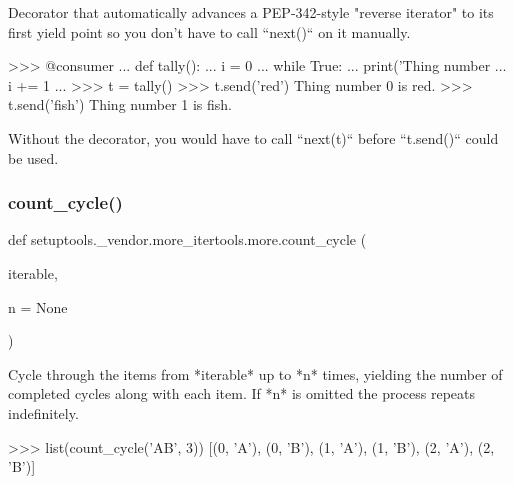 \begin{DoxyVerb}Decorator that automatically advances a PEP-342-style "reverse iterator"
to its first yield point so you don't have to call ``next()`` on it
manually.

    >>> @consumer
    ... def tally():
    ...     i = 0
    ...     while True:
    ...         print('Thing number %
    ...         i += 1
    ...
    >>> t = tally()
    >>> t.send('red')
    Thing number 0 is red.
    >>> t.send('fish')
    Thing number 1 is fish.

Without the decorator, you would have to call ``next(t)`` before
``t.send()`` could be used.\end{DoxyVerb}
 \mbox{\label{namespacesetuptools_1_1__vendor_1_1more__itertools_1_1more_a7bc0fb25048f2e5d9c13afa0b425a3a6}} 
\subsubsection{\texorpdfstring{count\+\_\+cycle()}{count\_cycle()}}
{\footnotesize\ttfamily def setuptools.\+\_\+vendor.\+more\+\_\+itertools.\+more.\+count\+\_\+cycle (\begin{DoxyParamCaption}\item[{}]{iterable,  }\item[{}]{n = {\ttfamily None} }\end{DoxyParamCaption})}

\begin{DoxyVerb}Cycle through the items from *iterable* up to *n* times, yielding
the number of completed cycles along with each item. If *n* is omitted the
process repeats indefinitely.

>>> list(count_cycle('AB', 3))
[(0, 'A'), (0, 'B'), (1, 'A'), (1, 'B'), (2, 'A'), (2, 'B')]\end{DoxyVerb}
 \mbox{\label{namespacesetuptools_1_1__vendor_1_1more__itertools_1_1more_a29e419785b6735ee5495c21142feaf8e}} 
